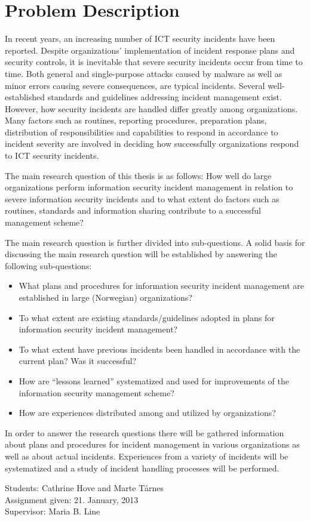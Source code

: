 \chapter*{Problem Description}
In recent years, an increasing number of ICT security incidents have been reported. Despite organizations’ implementation of incident response plans and security controls, it is inevitable that severe security incidents occur from time to time.  Both general and single-purpose attacks caused by malware as well as minor errors causing severe consequences, are typical incidents. Several well-established standards and guidelines addressing incident management exist. However, how security incidents are handled differ greatly among organizations. Many factors such as routines, reporting procedures, preparation plans, distribution of responsibilities and capabilities to respond in accordance to incident severity are involved in deciding how successfully organizations respond to ICT security incidents. 

The main research question of this thesis is as follows:
How well do large organizations perform information security incident management in relation to severe information security incidents and to what extent do factors such as routines, standards and information sharing contribute to a successful management scheme?

The main research question is further divided into sub-questions. A solid basis for discussing the main research question will be established by answering the following sub-questions:

\begin{itemize}\itemsep-0.15cm
\item What plans and procedures for information security incident management are established in large (Norwegian) organizations?
\item To what extent are existing standards/guidelines adopted in plans for information security incident management?
\item To what extent have previous incidents been handled in accordance with the current plan? Was it successful?
\item How are “lessons learned” systematized and used for improvements of the information security management scheme?
\item How are experiences distributed among and utilized by organizations?
\end{itemize}

In order to answer the research questions there will be gathered information about plans and procedures for incident management in various organizations as well as about actual incidents. Experiences from a variety of incidents will be systematized and a study of incident handling processes will be performed.

Students: Cathrine Hove and Marte T\aa rnes \\
Assignment given: 21. January, 2013 \\
Supervisor: Maria B. Line